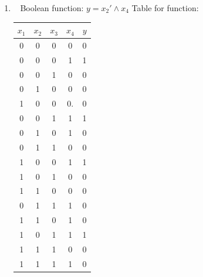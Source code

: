 \documentclass[12pt, fullpage,letterpaper]{article}
\begin{document}
\begin{enumerate}
\begin{enumerate}
\item~
\newline Boolean function: $y=x_2' \wedge x_4$ 
\newline Table for function:
\begin{table}[h]
	\centering
	\begin{tabular}{cccc|c}
		$x_1$ & $x_2$ & $x_3$ & $x_4$ & $y$\\ 
		\hline\hline
		0 & 0 & 0 & 0 & 0 \\ \hline
		0 & 0 & 0 & 1 & 1 \\ \hline
		0 & 0 & 1 & 0 & 0 \\ \hline
		0 & 1 & 0 & 0 & 0 \\ \hline
		1 & 0 & 0 & 0.& 0\\ \hline
		0 & 0 & 1 & 1 & 1\\ \hline
		0 & 1 & 0 & 1 & 0\\ \hline
		0 & 1 & 1 & 0 & 0 \\ \hline
		1 & 0 & 0 & 1 & 1 \\ \hline
		1 & 0 & 1 & 0 & 0 \\ \hline
		1 & 1 & 0 & 0 & 0 \\ \hline
		0 & 1 & 1 & 1 & 0\\ \hline
		1 & 1 & 0 & 1 & 0\\ \hline
		1 & 0 & 1 & 1 & 1\\ \hline
		1 & 1 & 1 & 0 & 0\\ \hline
		1 & 1 & 1 & 1 & 0\\ \hline
	\end{tabular}
\end{table}


\end{enumerate}
\end{enumerate}
\end{document}
